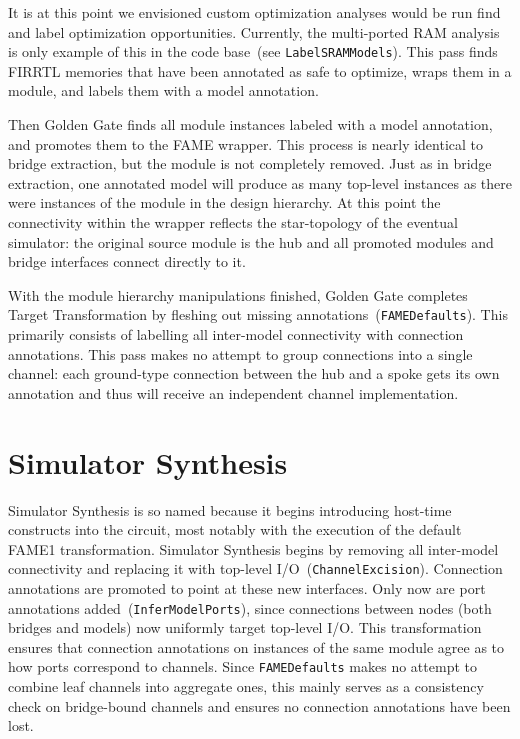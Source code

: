 It is at this point we envisioned custom optimization analyses would be run
find and label optimization opportunities. Currently, the multi-ported RAM
analysis is only example of this in the code base~(see
\texttt{LabelSRAMModels}).  This pass finds FIRRTL memories that have been
annotated as safe to optimize, wraps them in a module, and labels them with a
model annotation.

Then Golden Gate finds all module instances labeled with a model annotation, and
promotes them to the FAME wrapper. This process is nearly identical
to bridge extraction, but the module is not completely removed. Just as in
bridge extraction, one annotated model will produce as many top-level instances
as there were instances of the module in the design hierarchy.  At this point
the connectivity within the wrapper reflects the star-topology of the eventual
simulator: the original source module is the hub and all promoted modules and
bridge interfaces connect directly to it.

With the module hierarchy manipulations finished, Golden Gate completes Target
Transformation by fleshing out missing annotations~(\texttt{FAMEDefaults}). This primarily consists of labelling
all inter-model connectivity with connection annotations. This pass makes no
attempt to group connections into a single channel: each ground-type
connection between the hub and a spoke gets its own annotation and thus will receive an independent channel implementation.

\section{Simulator Synthesis}

Simulator Synthesis is so named because it begins introducing host-time constructs into the circuit,
most notably with the execution of the default FAME1 transformation. Simulator
Synthesis begins by removing all inter-model connectivity and replacing it
with top-level I/O~(\texttt{ChannelExcision}). Connection annotations are
promoted to point at these new interfaces. Only now are port annotations
added~(\texttt{InferModelPorts}), since connections between nodes (both bridges and models)
now uniformly target top-level I/O.  This transformation
ensures that connection annotations on instances of the same module agree as to how
ports correspond to channels. Since \texttt{FAMEDefaults} makes no attempt to
combine leaf channels into aggregate ones, this mainly serves as a consistency check on
bridge-bound channels and ensures no connection annotations have been lost.

